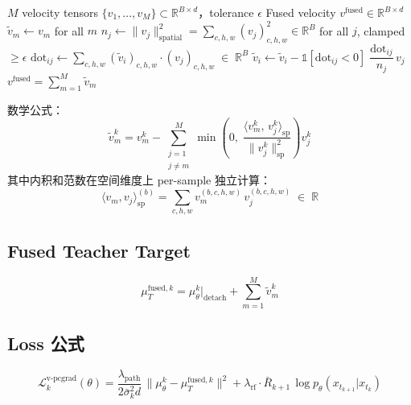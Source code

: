\documentclass[11pt,a4paper]{article}
\newcommand{\loss}{\mathcal{L}}
\newcommand{\R}{\mathbb{R}}
\newcommand{\mutheta}{\mu_\theta}
\newcommand{\sigbar}{\bar{\sigma}}
\newcommand{\Rbar}{\bar{R}}
\newcommand{\lpath}{\lambda_{\mathrm{path}}}
\newcommand{\lrf}{\lambda_{\mathrm{rf}}}
\newcommand{\detach}{\mathrm{detach}}
\theoremstyle{definition}
\begin{document}
\begin{algorithm}[H]
\caption{PCGrad Projection in Velocity Space (per-sample)}
\label{alg:v_pcgrad}
\begin{algorithmic}[1]
\Require $M$ velocity tensors $\{v_1, \ldots, v_M\} \subset \R^{B \times d}$，tolerance $\epsilon$
\Ensure Fused velocity $v^{\mathrm{fused}} \in \R^{B \times d}$
\State $\tilde{v}_m \gets v_m$ for all $m$
\State $n_j \gets \|v_j\|_{\mathrm{spatial}}^2 = \sum_{c,h,w} (v_j)_{c,h,w}^2 \in \R^B$ for all $j$, clamped $\geq \epsilon$
        \State $\mathrm{dot}_{ij} \gets \sum_{c,h,w} (\tilde{v}_i)_{c,h,w} \cdot (v_j)_{c,h,w} \;\in\; \R^B$ 
        \State $\tilde{v}_i \gets \tilde{v}_i - \mathbb{1}[\mathrm{dot}_{ij} < 0]\;\dfrac{\mathrm{dot}_{ij}}{n_j}\,v_j$ 
    \EndFor
\EndFor
\State \Return $v^{\mathrm{fused}} = \sum_{m=1}^M \tilde{v}_m$
\end{algorithmic}
\end{algorithm}

\noindent 数学公式：
\begin{equation}
\tilde{v}_m^k = v_m^k - \sum_{\substack{j=1\\j\neq m}}^M
\min\!\left(0,\;\frac{\langle v_m^k,\, v_j^k\rangle_{\mathrm{sp}}}{\|v_j^k\|_{\mathrm{sp}}^2}\right) v_j^k
\label{eq:v_pcgrad_proj}
\end{equation}
其中内积和范数在空间维度上 per-sample 独立计算：
\begin{equation}
\langle v_m, v_j \rangle_{\mathrm{sp}}^{(b)} = \sum_{c,h,w} v_m^{(b,c,h,w)}\, v_j^{(b,c,h,w)} \;\in\; \R
\end{equation}

\subsection{Fused Teacher Target}

\begin{equation}
\mu_T^{\mathrm{fused},k} = \mutheta^k\big|_{\detach} + \sum_{m=1}^M \tilde{v}_m^k
\label{eq:fused_target}
\end{equation}

\subsection{Loss 公式}

\begin{equation}
\boxed{
\loss_k^{\mathrm{v\text{-}pcgrad}}(\theta) = \frac{\lpath}{2\sigbar_k^2 d}\,
\bigl\|\mutheta^k - \mu_T^{\mathrm{fused},k}\bigr\|^2
+ \lrf \cdot \Rbar_{k+1}\,\log p_\theta(x_{t_{k+1}}|x_{t_k})
}
\label{eq:loss_vpcgrad}
\end{equation}
\end{document}
